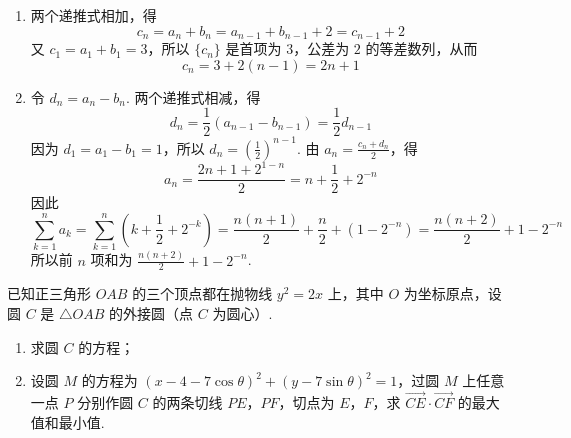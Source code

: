 \begin{solution}
\begin{enumerate}
\item 两个递推式相加，得
\[
c_n=a_n+b_n=a_{n-1}+b_{n-1}+2=c_{n-1}+2
\]
又 \(c_1=a_1+b_1=3\)，所以 \(\{c_n\}\) 是首项为 \(3\)，公差为 \(2\) 的等差数列，从而
\[
c_n=3+2(n-1)=2n+1
\]
\item 令 \(d_n=a_n-b_n\). 两个递推式相减，得
\[
d_n=\frac{1}{2}(a_{n-1}-b_{n-1})=\frac{1}{2}d_{n-1}
\]
因为 \(d_1=a_1-b_1=1\)，所以 \(d_n=\left(\frac{1}{2}\right)^{n-1}\). 由 \(a_n=\frac{c_n+d_n}{2}\)，得
\[
a_n=\frac{2n+1+2^{1-n}}{2}=n+\frac{1}{2}+2^{-n}
\]
因此
\[
\sum_{k=1}^{n}a_k=\sum_{k=1}^{n}\left(k+\frac{1}{2}+2^{-k}\right)=\frac{n(n+1)}{2}+\frac{n}{2}+\left(1-2^{-n}\right)=\frac{n(n+2)}{2}+1-2^{-n}
\]
所以前 \(n\) 项和为 \(\frac{n(n+2)}{2}+1-2^{-n}\).
\end{enumerate}
\end{solution}

\begin{problem}
已知正三角形 \(OAB\) 的三个顶点都在抛物线 \(y^2=2x\) 上，其中 \(O\) 为坐标原点，设圆 \(C\) 是 \(\triangle OAB\) 的外接圆（点 \(C\) 为圆心）.

\begin{enumerate}
\item 求圆 \(C\) 的方程；
\item 设圆 \(M\) 的方程为 \((x-4-7\cos\theta)^2+(y-7\sin\theta)^2=1\)，过圆 \(M\) 上任意一点 \(P\) 分别作圆 \(C\) 的两条切线 \(PE\)，\(PF\)，切点为 \(E\)，\(F\)，求 \(\overrightarrow{CE}\cdot\overrightarrow{CF}\) 的最大值和最小值.
\end{enumerate}
\end{problem}

